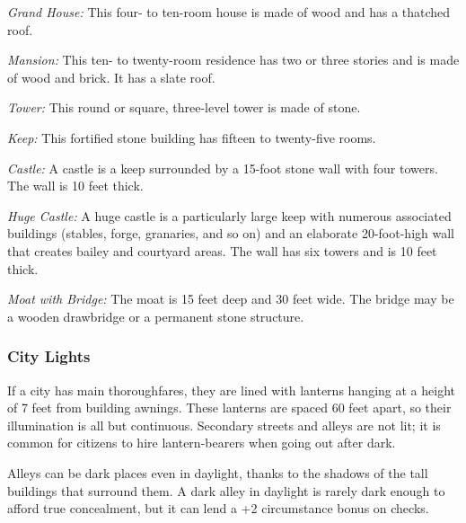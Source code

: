 \textit{Grand House:} This four- to ten-room house is made of wood and has a thatched 
roof.

\textit{Mansion:} This ten- to twenty-room residence has two or three stories and 
is made of wood and brick. It has a slate roof.

\textit{Tower:} This round or square, three-level tower is made of stone.

\textit{Keep:} This fortified stone building has fifteen to twenty-five rooms.

\textit{Castle:} A castle is a keep surrounded by a 15-foot stone wall with four 
towers. The wall is 10 feet thick.

\textit{Huge Castle:} A huge castle is a particularly large keep with numerous 
associated buildings (stables, forge, granaries, and so on) and an elaborate 20-foot-high 
wall that creates bailey and courtyard areas. The wall has six towers and is 10 
feet thick.

\textit{Moat with Bridge:} The moat is 15 feet deep and 30 feet wide. The bridge 
may be a wooden drawbridge or a permanent stone structure.

\subsubsection{City Lights}

If a city has main thoroughfares, they are lined with lanterns hanging at a height 
of 7 feet from building awnings. These lanterns are spaced 60 feet apart, so their 
illumination is all but continuous. Secondary streets and alleys are not lit; it 
is common for citizens to hire lantern-bearers when going out after dark.

Alleys can be dark places even in daylight, thanks to the shadows of the tall buildings 
that surround them. A dark alley in daylight is rarely dark enough to afford true 
concealment, but it can lend a +2 circumstance bonus on  checks.
